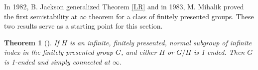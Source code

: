 \documentclass[12pt]{article}
\newtheorem{theorem}{Theorem}[subsection]
\begin{document}



 In 1982, B. Jackson generalized Theorem \ref{LR} and in 1983, M. Mihalik proved the first semistability at $\infty$ theorem for a class of finitely presented groups. These two  results serve as a starting point for this section. 

\begin{theorem} [\cite{J82a}] \label{J}  
If $H$ is an infinite, finitely presented, normal subgroup of infinite index in the finitely presented group $G$, and either $H$ or $G/H$ is 1-ended. Then $G$ is 1-ended and simply connected at $\infty$.   
\end{theorem}
\end{document}
